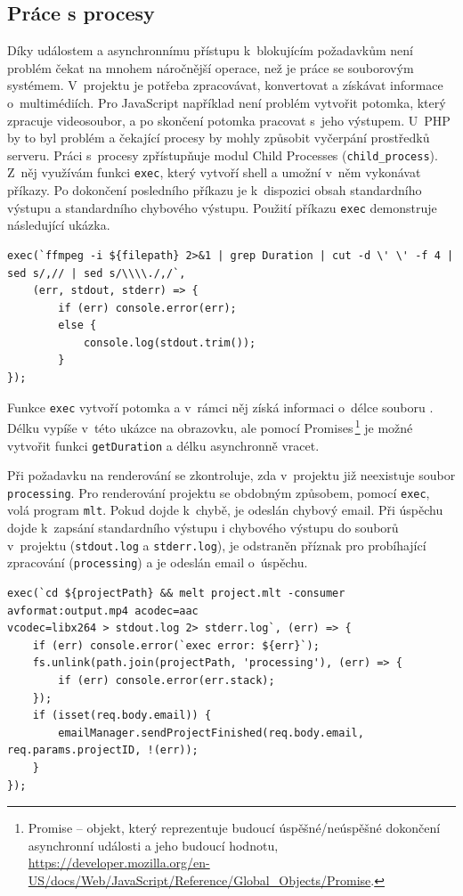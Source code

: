\subsection{Práce s procesy}\label{ch:Práce s procesy}
Díky událostem a asynchronnímu přístupu k~blokujícím požadavkům není problém čekat na mnohem náročnější operace, než je práce se souborovým systémem. V~projektu je potřeba zpracovávat, konvertovat a získávat informace o~multimédiích. Pro JavaScript například není problém vytvořit potomka, který zpracuje videosoubor, a po skončení potomka pracovat s~jeho výstupem. U~PHP by to byl problém a čekající procesy by mohly způsobit vyčerpání prostředků serveru. Práci s~procesy zpřístupňuje modul Child Processes (\texttt{child\_process}). Z~něj využívám funkci \texttt{exec}, který vytvoří shell a umožní v~něm vykonávat příkazy. Po dokončení posledního příkazu je k~dispozici obsah standardního výstupu a standardního chybového výstupu. Použití příkazu \texttt{exec} demonstruje následující ukázka.
\begin{lstlisting}[style=JavaScript]
exec(`ffmpeg -i ${filepath} 2>&1 | grep Duration | cut -d \' \' -f 4 | sed s/,// | sed s/\\\\./,/`,
    (err, stdout, stderr) => {
        if (err) console.error(err);
        else {
            console.log(stdout.trim());
        }
});
\end{lstlisting}
Funkce \texttt{exec} vytvoří potomka a v~rámci něj získá informaci o~délce souboru . Délku vypíše v~této ukázce na obrazovku, ale pomocí Promises\,\footnote{Promise -- objekt, který reprezentuje budoucí úspěšné/neúspěšné dokončení asynchronní události a jeho budoucí hodnotu, \url{https://developer.mozilla.org/en-US/docs/Web/JavaScript/Reference/Global_Objects/Promise}.} je možné vytvořit funkci \texttt{getDuration} a délku asynchronně vracet.

Při požadavku na renderování se zkontroluje, zda v~projektu již neexistuje soubor \texttt{processing}. Pro renderování projektu se obdobným způsobem, pomocí \texttt{exec}, volá program \texttt{mlt}. Pokud dojde k~chybě, je odeslán chybový email. Při úspěchu dojde k~zapsání standardního výstupu i chybového výstupu do souborů v~projektu (\texttt{stdout.log} a \texttt{stderr.log}), je odstraněn příznak pro probíhající zpracování (\texttt{processing}) a je odeslán email o~úspěchu.
\begin{lstlisting}[style=JavaScript]
exec(`cd ${projectPath} && melt project.mlt -consumer avformat:output.mp4 acodec=aac
vcodec=libx264 > stdout.log 2> stderr.log`, (err) => {
    if (err) console.error(`exec error: ${err}`);
    fs.unlink(path.join(projectPath, 'processing'), (err) => {
        if (err) console.error(err.stack);
    });
    if (isset(req.body.email)) {
        emailManager.sendProjectFinished(req.body.email, req.params.projectID, !(err));
    }
});
\end{lstlisting}\textbf{}

